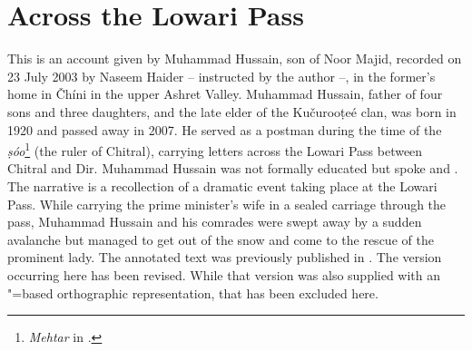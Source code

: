 \appendix
{}

\section*{Across the Lowari Pass}

This is an account given by Muhammad Hussain, son of Noor Majid, recorded on 23 July 2003 by Naseem Haider -- instructed by the author --, in the former’s home in Čhíni in the upper Ashret Valley. Muhammad Hussain, father of four sons and three daughters, and the late elder of the Kučurooṭeé clan, was born in 1920 and passed away in 2007. He served as a postman during the time of the \textit{ṣóo}\footnote{\textit{Mehtar} in \iliKhowar.} (the ruler of Chitral), carrying letters across the Lowari Pass between Chitral and Dir. Muhammad Hussain was not formally educated but spoke \iliPashto and \iliKhowar. The narrative is a recollection of a dramatic event taking place at the Lowari Pass. While carrying the prime minister’s wife in a sealed carriage through the pass, Muhammad Hussain and his comrades were swept away by a sudden avalanche but managed to get out of the snow and come to the rescue of the prominent lady. The annotated text was previously published in \citet[131--137]{liljegrenhaider2015}. The version occurring here has been revised. While that version was also supplied with an \iliArabic"=based orthographic representation, that has been excluded here.


